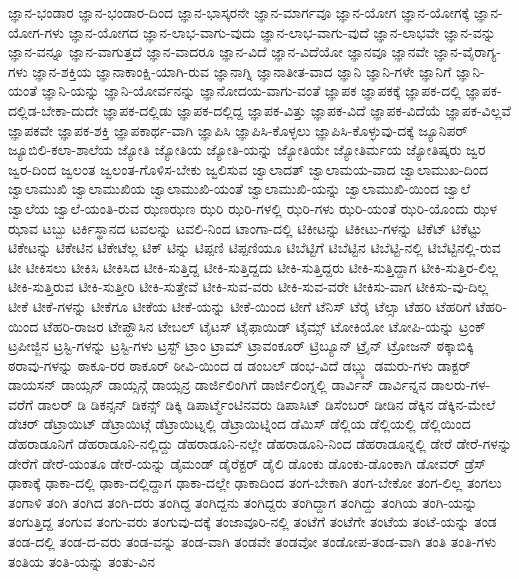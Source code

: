 {ಜ್ಞಾನ-ಭಂಡಾರ
ಜ್ಞಾನ-ಭಂಡಾರ-ದಿಂದ
ಜ್ಞಾನ-ಭಾಸ್ಕರನೇ
ಜ್ಞಾನ-ಮಾರ್ಗವೂ
ಜ್ಞಾನ-ಯೋಗ
ಜ್ಞಾನ-ಯೋಗಕ್ಕೆ
ಜ್ಞಾನ-ಯೋಗ-ಗಳು
ಜ್ಞಾನ-ಯೋಗದ
ಜ್ಞಾನ-ಲಾಭ-ವಾಗು-ವುದು
ಜ್ಞಾನ-ಲಾಭ-ವಾಗು-ವುದೆ
ಜ್ಞಾನ-ಲಾಭವೇ
ಜ್ಞಾನ-ವನ್ನು
ಜ್ಞಾನ-ವನ್ನೂ
ಜ್ಞಾನ-ವಾಗುತ್ತದೆ
ಜ್ಞಾನ-ವಾದರೂ
ಜ್ಞಾನ-ವಿದೆ
ಜ್ಞಾನ-ವಿದೆಯೋ
ಜ್ಞಾನವೂ
ಜ್ಞಾನವೇ
ಜ್ಞಾನ-ವೈರಾಗ್ಯ-ಗಳು
ಜ್ಞಾನ-ಶಕ್ತಿಯ
ಜ್ಞಾನಾಕಾಂಕ್ಷಿ-ಯಾಗಿ-ರುವ
ಜ್ಞಾನಾಗ್ನಿ
ಜ್ಞಾನಾತೀತ-ವಾದ
ಜ್ಞಾನಿ
ಜ್ಞಾನಿ-ಗಳೇ
ಜ್ಞಾನಿಗೆ
ಜ್ಞಾನಿ-ಯಂತೆ
ಜ್ಞಾನಿ-ಯನ್ನು
ಜ್ಞಾನಿ-ಯೋರ್ವನನ್ನು
ಜ್ಞಾನೋದಯ-ವಾಗು-ವಂತೆ
ಜ್ಞಾಪಕ
ಜ್ಞಾಪಕಕ್ಕೆ
ಜ್ಞಾಪಕ-ದಲ್ಲಿ
ಜ್ಞಾಪಕ-ದಲ್ಲಿಡ-ಬೇಕಾ-ದುದೇ
ಜ್ಞಾಪಕ-ದಲ್ಲಿಡು
ಜ್ಞಾಪಕ-ದಲ್ಲಿದ್ದ
ಜ್ಞಾಪಕ-ವಿತ್ತು
ಜ್ಞಾಪಕ-ವಿದೆ
ಜ್ಞಾಪಕ-ವಿದೆಯೆ
ಜ್ಞಾಪಕ-ವಿಲ್ಲವೆ
ಜ್ಞಾಪಕವೇ
ಜ್ಞಾಪಕ-ಶಕ್ತಿ
ಜ್ಞಾಪಕಾರ್ಥ-ವಾಗಿ
ಜ್ಞಾಪಿಸಿ
ಜ್ಞಾಪಿಸಿ-ಕೊಳ್ಳಲು
ಜ್ಞಾಪಿಸಿ-ಕೊಳ್ಳುವು-ದಕ್ಕೆ
ಜ್ಯೂನಿಪರ್
ಜ್ಯೂಬಿಲಿ-ಕಲಾ-ಶಾಲೆಯ
ಜ್ಯೋತಿ
ಜ್ಯೋತಿಯ
ಜ್ಯೋತಿ-ಯನ್ನು
ಜ್ಯೋತಿಯೇ
ಜ್ಯೋತಿರ್ಮಯ
ಜ್ಯೋತಿಷ್ಕರು
ಜ್ವರ
ಜ್ವರ-ದಿಂದ
ಜ್ವಲಂತ
ಜ್ವಲಂತ-ಗೊಳಿಸ-ಬೇಕು
ಜ್ವಲಿಸುವ
ಜ್ವಾಲಾದತ್
ಜ್ವಾಲಾಮಯ-ವಾದ
ಜ್ವಾಲಾಮುಖ-ದಿಂದ
ಜ್ವಾಲಾಮುಖಿ
ಜ್ವಾಲಾಮುಖಿಯ
ಜ್ವಾಲಾಮುಖಿ-ಯಂತೆ
ಜ್ವಾಲಾಮುಖಿ-ಯನ್ನು
ಜ್ವಾಲಾಮುಖಿ-ಯಿಂದ
ಜ್ವಾಲೆ
ಜ್ವಾಲೆಯ
ಜ್ವಾಲೆ-ಯಂತಿ-ರುವ
ಝಣಝಣ
ಝರಿ
ಝರಿ-ಗಳಲ್ಲಿ
ಝರಿ-ಗಳು
ಝರಿ-ಯಂತೆ
ಝರಿ-ಯೊಂದು
ಝಳ
ಝಾವ
ಟಬ್ಬು
ಟರ್ಕಿಸ್ಥಾನದ
ಟವಲನ್ನು
ಟವಲಿ-ನಿಂದ
ಟಾಂಗಾ-ದಲ್ಲಿ
ಟಿಕೀಟನ್ನು
ಟಿಕೀಟು-ಗಳನ್ನು
ಟಿಕೆಟ್
ಟಿಕೆಟ್ಟು
ಟಿಕೇಟನ್ನು
ಟಿಕೇಟಿನ
ಟಿಕೇಟೆಲ್ಲ
ಟಿಕ್
ಟಿನ್ನು
ಟಿಪ್ಪಣಿ
ಟಿಪ್ಪಣಿಯೂ
ಟಿಬೆಟ್ಟಿಗೆ
ಟಿಬೆಟ್ಟಿನ
ಟಿಬೆಟ್ಟಿ-ನಲ್ಲಿ
ಟಿಬೆಟ್ಟಿನಲ್ಲಿ-ರುವ
ಟೀ
ಟೀಕಿಸಲು
ಟೀಕಿಸಿ
ಟೀಕಿಸಿದ
ಟೀಕಿ-ಸುತ್ತಿದ್ದ
ಟೀಕಿ-ಸುತ್ತಿದ್ದದು
ಟೀಕಿ-ಸುತ್ತಿದ್ದರು
ಟೀಕಿ-ಸುತ್ತಿದ್ದಾಗ
ಟೀಕಿ-ಸುತ್ತಿರ-ಲಿಲ್ಲ
ಟೀಕಿ-ಸುತ್ತಿರುವ
ಟೀಕಿ-ಸುತ್ತೀರಿ
ಟೀಕಿ-ಸುತ್ತೇವೆ
ಟೀಕಿ-ಸುವ-ವರು
ಟೀಕಿ-ಸುವ-ವರೇ
ಟೀಕಿಸು-ವಾಗ
ಟೀಕಿಸು-ವು-ದಿಲ್ಲ
ಟೀಕೆ
ಟೀಕೆ-ಗಳನ್ನು
ಟೀಕೆಗೂ
ಟೀಕೆಯ
ಟೀಕೆ-ಯನ್ನು
ಟೀಕೆ-ಯಿಂದ
ಟೀಗೆ
ಟೆನಿಸ್
ಟೆರೈ
ಟೆಲ್ಸಾ
ಟೆಹರಿ
ಟೆಹರಿಗೆ
ಟೆಹರಿ-ಯಿಂದ
ಟೆಹರಿ-ರಾಜರ
ಟೇಪ್ಹೌಸಿನ
ಟೇಬಲ್
ಟೈಟಸ್
ಟೈಫಾಯಿಡ್
ಟೈಮ್ಸ್
ಟೋಕಿಯೋ
ಟೋಪಿ-ಯನ್ನು
ಟ್ರಂಕ್
ಟ್ರಪೀಜ್ಜಿನ
ಟ್ರಸ್ಟಿ-ಗಳನ್ನು
ಟ್ರಸ್ಟಿ-ಗಳು
ಟ್ರಸ್ಟ್
ಟ್ರಾಂ
ಟ್ರಾಮ್
ಟ್ರಾವಂಕೂರ್
ಟ್ರಿಬ್ಯೂನ್
ಟ್ರೈನ್
ಟ್ರೋಜನ್
ಠಕ್ಕಾಬಿಕ್ಕಿ
ಠರಾವು-ಗಳನ್ನು
ಠಾಕೂ-ರರ
ಠಾಕೂರ್
ಠೀವಿ-ಯಿಂದ
ಡ
ಡಂಬಲ್
ಡಂಭ-ವಿದೆ
ಡಬ್ಲ್ಯು
ಡಮರು-ಗಳು
ಡಾಕ್ಟರ್
ಡಾಯಸನ್
ಡಾಯ್ಸನ್
ಡಾಯ್ಸನ್ಗೆ
ಡಾಯ್ಸನ್ರ
ಡಾರ್ಜಿಲಿಂಗಿಗೆ
ಡಾರ್ಜಿಲಿಂಗ್ನಲ್ಲಿ
ಡಾರ್ವಿನ್
ಡಾರ್ವಿನ್ನನ
ಡಾಲರು-ಗಳ-ವರೆಗೆ
ಡಾಲರ್
ಡಿ
ಡಿಕನ್ಸನ್
ಡಿಕನ್ಸ್
ಡಿಕ್ಕಿ
ಡಿಪಾರ್ಟ್ಮೆಂಟಿನವರು
ಡಿಪಾಸಿಟ್
ಡಿಸೆಂಬರ್
ಡೀಡಿನ
ಡೆಕ್ಕಿನ
ಡೆಕ್ಕಿನ-ಮೇಲೆ
ಡೆಚರ್
ಡೆಟ್ರಾಯಿಟ್
ಡೆಟ್ರಾಯಿಟ್ಗೆ
ಡೆಟ್ರಾಯಿಟ್ನಲ್ಲಿ
ಡೆಟ್ರಾಯಿಟ್ನಿಂದ
ಡೆಮಿಸ್
ಡೆಲ್ಲಿಯ
ಡೆಲ್ಲಿಯಲ್ಲಿ
ಡೆಲ್ಲಿಯಿಂದ
ಡೆಹರಾಡೂನಿಗೆ
ಡೆಹರಾಡೂನಿ-ನಲ್ಲಿದ್ದು
ಡೆಹರಾಡೂನಿ-ನಲ್ಲೇ
ಡೆಹರಾಡೂನಿ-ನಿಂದ
ಡೆಹರಾಡೂನ್ನಲ್ಲಿ
ಡೇರೆ
ಡೇರೆ-ಗಳನ್ನು
ಡೇರೆಗೆ
ಡೇರೆ-ಯಂತೂ
ಡೇರೆ-ಯನ್ನು
ಡೈಮಂಡ್
ಡೈರೆಕ್ಟರ್
ಡೈಲಿ
ಡೊಂಕು
ಡೊಂಕು-ಡೊಂಕಾಗಿ
ಡೋವರ್
ಡ್ರೆಸ್
ಢಾಕಾಕ್ಕೆ
ಢಾಕಾ-ದಲ್ಲಿ
ಢಾಕಾ-ದಲ್ಲಿದ್ದಾಗ
ಢಾಕಾ-ದಲ್ಲೇ
ಢಾಕಾದಿಂದ
ತಂಗ-ಬೇಕಾಗಿ
ತಂಗ-ಬೇಕೋ
ತಂಗ-ಲಿಲ್ಲ
ತಂಗಲು
ತಂಗಾಳಿ
ತಂಗಿ
ತಂಗಿದ
ತಂಗಿ-ದರು
ತಂಗಿದ್ದ
ತಂಗಿದ್ದನು
ತಂಗಿದ್ದರು
ತಂಗಿದ್ದಾಗ
ತಂಗಿದ್ದು
ತಂಗಿಯ
ತಂಗಿ-ಯನ್ನು
ತಂಗುತ್ತಿದ್ದ
ತಂಗುವ
ತಂಗು-ವರು
ತಂಗುವು-ದಕ್ಕೆ
ತಂಜಾವೂರಿ-ನಲ್ಲಿ
ತಂಟೆಗೆ
ತಂಟೆಗೇ
ತಂಟೆಯ
ತಂಟೆ-ಯನ್ನು
ತಂಡ
ತಂಡ-ದಲ್ಲಿ
ತಂಡ-ದ-ವರು
ತಂಡ-ವನ್ನು
ತಂಡ-ವಾಗಿ
ತಂಡವೇ
ತಂಡವೋ
ತಂಡೋಪ-ತಂಡ-ವಾಗಿ
ತಂತಿ
ತಂತಿ-ಗಳು
ತಂತಿಯ
ತಂತಿ-ಯನ್ನು
ತಂತು-ವಿನ
}
